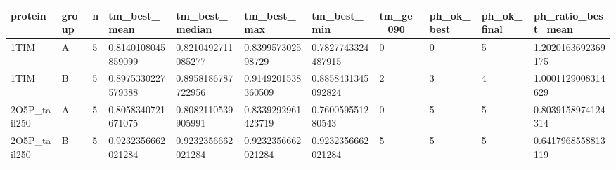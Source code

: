 \begin{tabular}{lllllllllll}
\toprule
protein & group & n & tm\_best\_mean & tm\_best\_median & tm\_best\_max & tm\_best\_min & tm\_ge\_090 & ph\_ok\_best & ph\_ok\_final & ph\_ratio\_best\_mean \\
\midrule
1TIM & A & 5 & 0.8140108045859099 & 0.8210492711085277 & 0.839957302598729 & 0.7827743324487915 & 0 & 0 & 5 & 1.2020163692369175 \\
1TIM & B & 5 & 0.8975330227579388 & 0.8958186787722956 & 0.9149201538360509 & 0.8858431345092824 & 2 & 3 & 4 & 1.0001129008314629 \\
2O5P\_tail250 & A & 5 & 0.8058340721671075 & 0.8082110539905991 & 0.8339292961423719 & 0.760059551280543 & 0 & 5 & 5 & 0.8039158974124314 \\
2O5P\_tail250 & B & 5 & 0.9232356662021284 & 0.9232356662021284 & 0.9232356662021284 & 0.9232356662021284 & 5 & 5 & 5 & 0.6417968558813119 \\
\bottomrule
\end{tabular}
